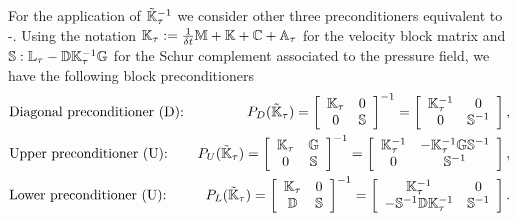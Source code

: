 For the application of $\tilde{\mathbb{K}}_\tau^{-1}$ we consider other three preconditioners equivalent to -. Using the notation $\mathbb{K}_\tau:=\frac{1}{\delta t}\mathbb{M}+\mathbb{K}+\mathbb{C}+\mathbb{A}_\tau$ for the velocity block matrix and $\mathbb{S}:\mathbb{L}_\tau-\mathbb{D}\mathbb{K}_\tau^{-1}\mathbb{G}$ for the Schur complement associated to the pressure field, we have the following block preconditioners
\begin{align}
\label{eq-C5_Stokes_d_precond}
&\mbox{Diagonal preconditioner (D):}&P_D(\tilde{\mathbb{K}}_\tau)=\left[\begin{array}{cc}
\mathbb{K}_\tau&0\\
0&\mathbb{S}
\end{array}\right]^{-1}=\left[\begin{array}{cc}
\mathbb{K}_\tau^{-1}&0\\
0&\mathbb{S}^{-1}
\end{array}\right],\\
\label{eq-C5_Stokes_u_precond}
&\mbox{Upper preconditioner (U):}&P_U(\tilde{\mathbb{K}}_\tau)=\left[\begin{array}{cc}
\mathbb{K}_\tau&\mathbb{G}\\
0&\mathbb{S}
\end{array}\right]^{-1}=\left[\begin{array}{cc}
\mathbb{K}_\tau^{-1}&-\mathbb{K}_\tau^{-1}\mathbb{G}\mathbb{S}^{-1}\\
0&\mathbb{S}^{-1}
\end{array}\right],\\
\label{eq-C5_Stokes_l_precond}
&\mbox{Lower preconditioner (U):}&P_L(\tilde{\mathbb{K}}_\tau)=\left[\begin{array}{cc}
\mathbb{K}_\tau&0\\
\mathbb{D}&\mathbb{S}
\end{array}\right]^{-1}=\left[\begin{array}{cc}
\mathbb{K}_\tau^{-1}&0\\
-\mathbb{S}^{-1}\mathbb{D}\mathbb{K}_\tau^{-1}&\mathbb{S}^{-1}
\end{array}\right].
\end{align}
